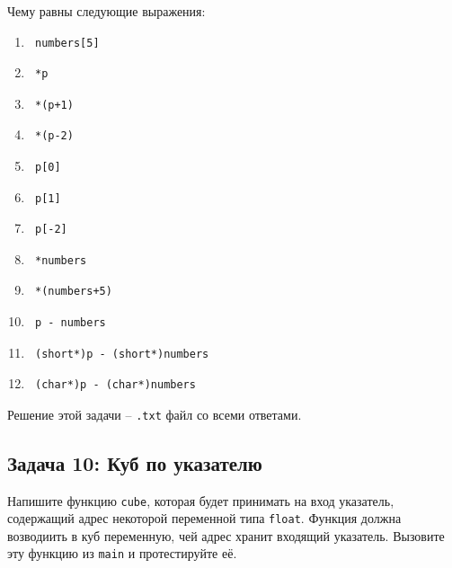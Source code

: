 \documentclass{article}
\begin{document}
Чему равны следующие выражения:
\begin{multicols}{3}
\begin{enumerate}
\item \begin{verbatim} numbers[5] \end{verbatim}
\item \begin{verbatim} *p \end{verbatim}
\item \begin{verbatim} *(p+1) \end{verbatim}
\item \begin{verbatim} *(p-2) \end{verbatim}
\item \begin{verbatim} p[0] \end{verbatim}
\item \begin{verbatim} p[1] \end{verbatim}
\item \begin{verbatim} p[-2] \end{verbatim}
\item \begin{verbatim} *numbers \end{verbatim}
\item \begin{verbatim} *(numbers+5) \end{verbatim}
\item \begin{verbatim} p - numbers \end{verbatim}
\item \begin{verbatim} (short*)p - (short*)numbers \end{verbatim}
\item \begin{verbatim} (char*)p - (char*)numbers \end{verbatim}
\end{enumerate}
\end{multicols}

Решение этой задачи -- \texttt{.txt} файл со всеми ответами.


\subsection*{Задача 10: Куб по указателю}
Напишите функцию \texttt{cube}, которая будет принимать на вход указатель, содержащий адрес некоторой переменной типа \texttt{float}. Функция должна возводиить в куб переменную, чей адрес хранит входящий указатель. Вызовите эту функцию из \texttt{main} и протестируйте её.
\end{document}
